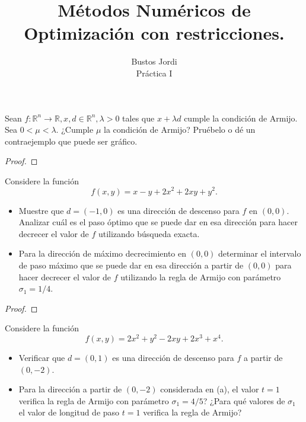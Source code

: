 \documentclass{article}
\newenvironment{theorem}[2][Ejercicio]{\begin{trivlist}
\item[\hskip \labelsep {\bfseries #1}\hskip \labelsep {\bfseries #2.}]}{\end{trivlist}}
\begin{document}
\title{Métodos Numéricos de Optimización con restricciones.}
\author{Bustos Jordi\\Práctica I}

\maketitle

\begin{theorem}{1}
    Sean \(f : \mathbb{R}^n \to \mathbb{R}, x, d \in \mathbb{R}^n, \lambda > 0\) tales que
    \(x + \lambda d\) cumple la condición de Armijo. Sea \(0 < \mu < \lambda\).
    ¿Cumple \(\mu \) la condición de Armijo? Pruébelo o dé un contraejemplo que puede ser gráfico.
\end{theorem}

\begin{proof}

\end{proof}

\vspace{0.25in}

\begin{theorem}{2}
    Considere la función
    \[
        f(x,y) = x - y + 2x^2 + 2xy + y^2.
    \]

    \begin{itemize}
        \item[(a)] Muestre que \(d = (-1,0)\) es una dirección de descenso para \(f\) en \((0,0)\).
              Analizar cuál es el paso óptimo que se puede dar en esa dirección para hacer decrecer el
              valor de \(f\) utilizando búsqueda exacta.

        \item[(b)] Para la dirección de máximo decrecimiento en \((0,0)\) determinar el intervalo
              de paso máximo que se puede dar en esa dirección a partir de \((0,0)\) para hacer decrecer
              el valor de \(f\) utilizando la regla de Armijo con parámetro \(\sigma_1 = 1/4\).
    \end{itemize}
\end{theorem}

\begin{proof}

\end{proof}

\vspace{0.25in}

\begin{theorem}{3}
    Considere la función
    \[
        f(x,y) = 2x^2 + y^2 - 2xy + 2x^3 + x^4.
    \]

    \begin{itemize}
        \item[(a)] Verificar que \(d = (0,1)\) es una dirección de descenso para \(f\) a partir de \((0,-2)\).

        \item[(b)] Para la dirección a partir de \((0,-2)\) considerada en (a), el valor \(t=1\) verifica
              la regla de Armijo con parámetro \(\sigma_1 = 4/5\)?
              ¿Para qué valores de \(\sigma_1\) el valor de longitud de paso \(t=1\) verifica la regla de Armijo?
    \end{itemize}
\end{theorem}
\end{document}
